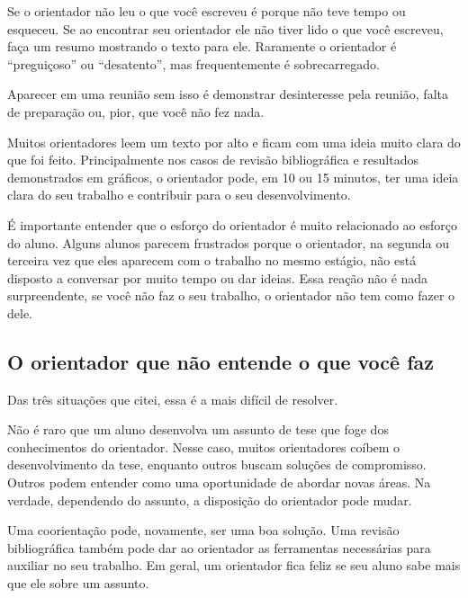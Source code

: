 Se o orientador não leu o que você escreveu é porque não teve tempo ou esqueceu. Se ao encontrar seu orientador ele não tiver lido o que você escreveu, faça um resumo mostrando o texto para ele. Raramente o orientador é ``preguiçoso'' ou ``desatento'', mas frequentemente é sobrecarregado. 




Aparecer em uma reunião sem isso é demonstrar desinteresse pela reunião, falta de preparação ou, pior, que você não fez nada.

Muitos orientadores leem um texto por alto e ficam com uma ideia muito clara do que foi feito. Principalmente nos casos de revisão bibliográfica e resultados demonstrados em gráficos, o orientador pode, em 10 ou 15 minutos, ter uma ideia clara do seu trabalho e contribuir para o seu desenvolvimento. 


É importante entender que o esforço do orientador é muito relacionado ao esforço do aluno. Alguns alunos parecem frustrados porque o orientador, na segunda ou terceira vez que eles aparecem com o trabalho no mesmo estágio, não está disposto a conversar por muito tempo ou dar ideias. Essa reação não é nada surpreendente, se você não faz o seu trabalho, o orientador não tem como fazer o dele.




\subsection{O orientador que não entende o que você faz}

Das três situações que citei, essa é a mais difícil de resolver.

Não é raro que um aluno desenvolva um assunto de tese que foge dos conhecimentos do orientador. Nesse caso, muitos orientadores coíbem o desenvolvimento da tese, enquanto outros buscam soluções de compromisso. Outros podem entender como uma oportunidade de abordar novas áreas. Na verdade, dependendo do assunto, a disposição do orientador pode mudar.

Uma coorientação pode, novamente, ser uma boa solução. Uma revisão bibliográfica também pode dar ao orientador as ferramentas necessárias para auxiliar no seu trabalho. Em geral, um orientador fica feliz se seu aluno sabe mais que ele sobre um assunto.


